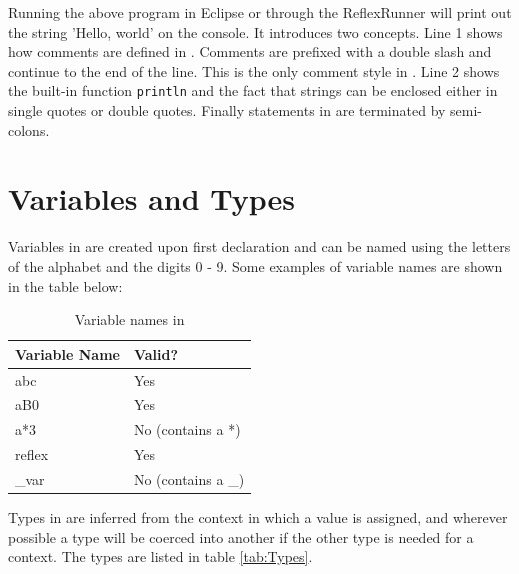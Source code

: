 Running the above program in Eclipse or through the ReflexRunner will print out the string 'Hello, world' on the console. It introduces two concepts. Line 1 shows how comments are defined in \Reflex. Comments are prefixed with a double slash and continue to the end of the line. This is the only comment style in \Reflex. Line 2 shows the built-in function \verb+println+ and the fact that strings can be enclosed either in single quotes or double quotes. Finally statements in \Reflex are terminated by semi-colons.

\section{Variables and Types}

Variables  in \Reflex are created upon first declaration and can be named using the letters of the alphabet and the digits 0 - 9. Some examples of variable names are shown in the table below:

\begin{table}[h]
\centering
\begin{tabular} { | l | l | }
Variable Name & Valid? \\
\hline
abc & Yes \\
aB0 & Yes \\
a*3 & No (contains a *) \\
reflex & Yes \\
\_var & No (contains a \_) \\
\end{tabular}
\caption{Variable names in \Reflex}
\end{table}

Types  in \Reflex are inferred from the context in which a value is assigned, and wherever possible a type will be coerced into another if the other type is needed for a context. The types are listed in table \vref{tab:Types}.

